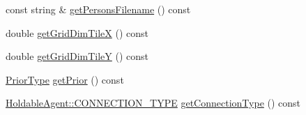 \begin{DoxyCompactItemize}
\item 
const string \& \hyperlink{class_world_a206508d427e13c242855d9e11e5bed72}{get\+Persons\+Filename} () const
\item 
double \hyperlink{class_world_aa62f6cd42214191e37b904a672306888}{get\+Grid\+Dim\+TileX} () const
\item 
double \hyperlink{class_world_a99a004c6f3ce1a3a76894bb1f9625bbe}{get\+Grid\+Dim\+TileY} () const
\item 
\hyperlink{_prior_type_8h_a61286c562e68de246982fc393a7c23a5}{Prior\+Type} \hyperlink{class_world_a9d7c2f5e7d357b891fac1728a932885f}{get\+Prior} () const
\item 
\hyperlink{class_holdable_agent_ae2c334b004d7b9c5a999cf2618e4e518}{Holdable\+Agent\+::\+C\+O\+N\+N\+E\+C\+T\+I\+O\+N\+\_\+\+T\+Y\+PE} \hyperlink{class_world_a35aafc469b9146b4b6f72c6adaa3e067}{get\+Connection\+Type} () const
\end{DoxyCompactItemize}
